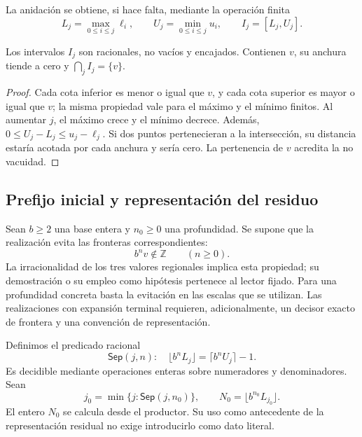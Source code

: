 La anidación se obtiene, si hace falta, mediante la operación finita
\begin{equation}
 L_j=\max_{0\leq i\leq j}\ell_i,
 \qquad U_j=\min_{0\leq i\leq j}u_i,
 \qquad I_j=[L_j,U_j].
 \label{eq:residual-anidacion}
\end{equation}

\begin{proposition}
\label{prop:residual-anidacion}
Los intervalos \(I_j\) son racionales, no vacíos y encajados. Contienen
\(v\), su anchura tiende a cero y \(\bigcap_j I_j=\{v\}\).
\end{proposition}
\begin{proof}
Cada cota inferior es menor o igual que \(v\), y cada cota superior es
mayor o igual que \(v\); la misma propiedad vale para el máximo y el mínimo
finitos. Al aumentar \(j\), el máximo crece y el mínimo decrece.
Además, \(0\leq U_j-L_j\leq u_j-\ell_j\). Si dos puntos pertenecieran a
la intersección, su distancia estaría acotada por cada anchura y sería cero.
La pertenencia de \(v\) acredita la no vacuidad.
\end{proof}

\subsection{Prefijo inicial y representación del residuo}
\label{subsec:residual-inicializacion}

Sean \(b\geq2\) una base entera y \(n_0\geq0\) una profundidad.
Se supone que la realización evita las fronteras correspondientes:
\begin{equation}
 b^n v\notin\mathbb Z\qquad(n\geq0).
 \label{eq:residual-no-frontera}
\end{equation}
La irracionalidad de los tres valores regionales implica esta propiedad;
su demostración o su empleo como hipótesis pertenece al lector fijado.
Para una profundidad concreta basta la evitación en las escalas que se
utilizan. Las realizaciones con expansión terminal requieren, adicionalmente,
un decisor exacto de frontera y una convención de representación.

Definimos el predicado racional
\[
 \mathsf{Sep}(j,n):\quad
 \lfloor b^n L_j\rfloor=\lceil b^n U_j\rceil-1.
\]
Es decidible mediante operaciones enteras sobre numeradores y
denominadores. Sean
\begin{equation}
 j_0=\min\{j:\mathsf{Sep}(j,n_0)\},
 \qquad N_0=\lfloor b^{n_0}L_{j_0}\rfloor.
 \label{eq:residual-prefijo-inicial}
\end{equation}
El entero \(N_0\) se calcula desde el productor. Su uso como antecedente
de la representación residual no exige introducirlo como dato literal.

